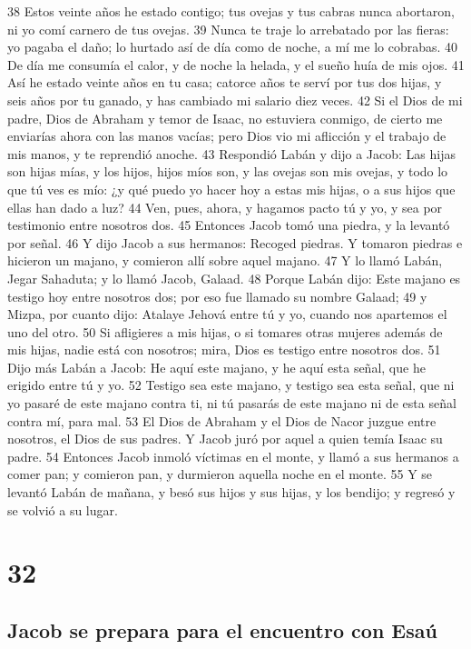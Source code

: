 38 Estos veinte años he estado contigo; tus ovejas y tus cabras nunca abortaron, ni yo comí carnero de tus ovejas.
39 Nunca te traje lo arrebatado por las fieras: yo pagaba el daño; lo hurtado así de día como de noche, a mí me lo cobrabas.
40 De día me consumía el calor, y de noche la helada, y el sueño huía de mis ojos.
41 Así he estado veinte años en tu casa; catorce años te serví por tus dos hijas, y seis años por tu ganado, y has cambiado mi salario diez veces.
42 Si el Dios de mi padre, Dios de Abraham y temor de Isaac, no estuviera conmigo, de cierto me enviarías ahora con las manos vacías; pero Dios vio mi aflicción y el trabajo de mis manos, y te reprendió anoche.
43 Respondió Labán y dijo a Jacob: Las hijas son hijas mías, y los hijos, hijos míos son, y las ovejas son mis ovejas, y todo lo que tú ves es mío: ¿y qué puedo yo hacer hoy a estas mis hijas, o a sus hijos que ellas han dado a luz?
44 Ven, pues, ahora, y hagamos pacto tú y yo, y sea por testimonio entre nosotros dos.
45 Entonces Jacob tomó una piedra, y la levantó por señal.
46 Y dijo Jacob a sus hermanos: Recoged piedras. Y tomaron piedras e hicieron un majano, y comieron allí sobre aquel majano.
47 Y lo llamó Labán, Jegar Sahaduta; y lo llamó Jacob, Galaad.
48 Porque Labán dijo: Este majano es testigo hoy entre nosotros dos; por eso fue llamado su nombre Galaad;
49 y Mizpa, por cuanto dijo: Atalaye Jehová entre tú y yo, cuando nos apartemos el uno del otro.
50 Si afligieres a mis hijas, o si tomares otras mujeres además de mis hijas, nadie está con nosotros; mira, Dios es testigo entre nosotros dos.
51 Dijo más Labán a Jacob: He aquí este majano, y he aquí esta señal, que he erigido entre tú y yo.
52 Testigo sea este majano, y testigo sea esta señal, que ni yo pasaré de este majano contra ti, ni tú pasarás de este majano ni de esta señal contra mí, para mal.
53 El Dios de Abraham y el Dios de Nacor juzgue entre nosotros, el Dios de sus padres. Y Jacob juró por aquel a quien temía Isaac su padre.
54 Entonces Jacob inmoló víctimas en el monte, y llamó a sus hermanos a comer pan; y comieron pan, y durmieron aquella noche en el monte.
55 Y se levantó Labán de mañana, y besó sus hijos y sus hijas, y los bendijo; y regresó y se volvió a su lugar.

\chapter{32}

\section*{Jacob se prepara para el encuentro con Esaú}

